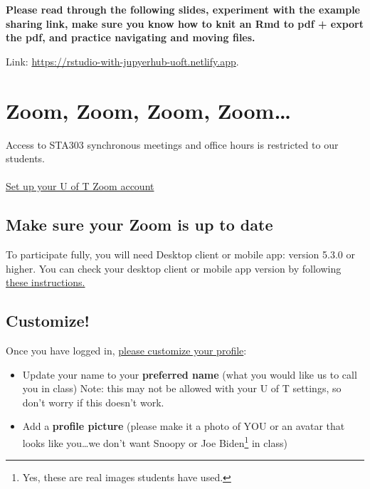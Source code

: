 \documentclass[
  openany]{book}
\begin{document}
\textbf{Please read through the following slides, experiment with the example sharing link, make sure you know how to knit an Rmd to pdf + export the pdf, and practice navigating and moving files.}

Link: \url{https://rstudio-with-jupyerhub-uoft.netlify.app}.

\hypertarget{zoom-zoom-zoom-zoom}{%
\section{Zoom, Zoom, Zoom, Zoom\ldots{}}\label{zoom-zoom-zoom-zoom}}

\hfill\break
Access to STA303 synchronous meetings and office hours is restricted to our students.\\
~\\

\href{https://utoronto.zoom.us/signin}{Set up your U of T Zoom account}

\hypertarget{make-sure-your-zoom-is-up-to-date}{%
\subsection{Make sure your Zoom is up to date}\label{make-sure-your-zoom-is-up-to-date}}

To participate fully, you will need Desktop client or mobile app: version 5.3.0 or higher. You can check your desktop client or mobile app version by following \href{https://support.zoom.us/hc/en-us/articles/201362393-Viewing-the-Zoom-version-number}{these instructions.}

\hypertarget{customize}{%
\subsection{Customize!}\label{customize}}

Once you have logged in, \href{https://support.zoom.us/hc/en-us/articles/201363203-Customizing-your-Profile}{please customize your profile}:

\begin{itemize}
\item
  Update your name to your \textbf{preferred name} (what you would like us to call you in class) Note: this may not be allowed with your U of T settings, so don't worry if this doesn't work.
\item
  Add a \textbf{profile picture} (please make it a photo of YOU or an avatar that looks like you\ldots we don't want Snoopy or Joe Biden\footnote{Yes, these are real images students have used.} in class)
\end{itemize}
\end{document}
